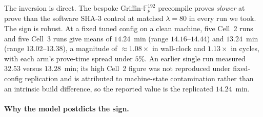 The inversion is direct. The bespoke Griffin-$\mathbb{F}_p^{192}$ precompile proves \emph{slower} at prove than the software SHA-3 control at matched $\lambda=80$ in every run we took. The sign is robust. At a fixed tuned config on a clean machine, five Cell~2 runs and five Cell~3 runs give means of $14.24$~min (range $14.16$--$14.44$) and $13.24$~min (range $13.02$--$13.38$), a magnitude of ${\approx}1.08\times$ in wall-clock and $1.13\times$ in cycles, with each arm's prove-time spread under $5\%$. An earlier single run measured $32.53$ versus $13.28$~min; its high Cell~2 figure was not reproduced under fixed-config replication and is attributed to machine-state contamination rather than an intrinsic build difference, so the reported value is the replicated $14.24$~min.

\paragraph{Why the model postdicts the sign.}

